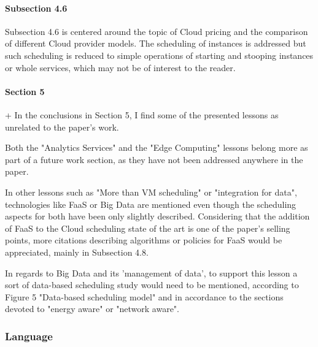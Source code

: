 \paragraph{Subsection 4.6}

Subsection 4.6 is centered around the topic of Cloud pricing and the
comparison of different Cloud provider models. The scheduling of
instances is addressed but such scheduling is reduced to simple
operations of starting and stooping instances or whole services, which
may not be of interest to the reader.


\paragraph{Section 5}

+ In the conclusions in Section 5, I find some of the presented
lessons as unrelated to the paper's work. 

Both the "Analytics
Services" and the "Edge Computing" lessons belong more as part of a
future work section, as they have not been addressed anywhere in the
paper. 


In other lessons such as "More than VM scheduling" or
"integration for data", technologies like FaaS or Big Data are
mentioned even though the scheduling aspects for both have been only
slightly described. Considering that the addition of FaaS to the Cloud
scheduling state of the art is one of the paper's selling points, more
citations describing algorithms or policies for FaaS would be
appreciated, mainly in Subsection 4.8. 


In regards to Big Data and its
'management of data', to support this lesson a sort of data-based
scheduling study would need to be mentioned, according to Figure 5
"Data-based scheduling model" and in accordance to the sections
devoted to "energy aware" or "network aware".




\subsubsection{Language}

